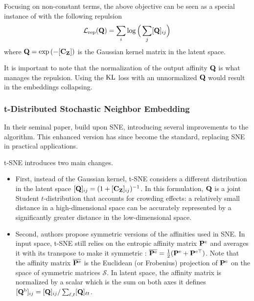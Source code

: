 Focusing on non-constant terms, the above objective can be seen as a special instance of  with the following repulsion
\begin{align}
    \mathcal{L}_{\mathrm{rep}}({\mathbf{Q}}) = \sum_{i} \log \Big(\sum_j [{\mathbf{Q}}]_{ij} \Big)
\end{align}
where ${\mathbf{Q}} = \exp{(-[{\mathbf{C}}_{{\mathbf{Z}}}])}$ is the Gaussian kernel matrix in the latent space.

\begin{remark}\label{rem:norm_as_repulsion}
    It is important to note that the normalization of the output affinity ${\mathbf{Q}}$ is what manages the repulsion. Using the $\operatorname{KL}$ loss with an unnormalized ${\mathbf{Q}}$ would result in the embeddings collapsing. 
\end{remark}

\subsubsection{t-Distributed Stochastic Neighbor Embedding}

In their seminal paper, \citet{van2008visualizing} build upon SNE, introducing several improvements to the algorithm. This enhanced version has since become the standard, replacing SNE in practical applications.

t-SNE introduces two main changes. 
\begin{itemize}
    \item First, instead of the Gaussian kernel, t-SNE considers a different distribution in the latent space $[{\mathbf{Q}}]_{ij} = (1 + [\mathbf{C}_{\mathbf{Z}}]_{ij})^{-1}$. In this formulation, ${\mathbf{Q}}$ is a joint Student $t$-distribution that accounts for crowding effects: a relatively small
    distance in a high-dimensional space can be accurately represented by a
    significantly greater distance in the low-dimensional space. 
    \item Second, authors propose symmetric versions of the affinities used in SNE. In input space, t-SNE still relies on the entropic affinity matrix ${\mathbf{P}}^{\mathrm{e}}$ and averages it with its transpose to make it symmetric : $\overline{{\mathbf{P}}^{\mathrm{e}}} = \frac{1}{2}({\mathbf{P}}^{\mathrm{e}} + {\mathbf{P}}^{\mathrm{e} \top})$. Note that the affinity matrix $\overline{{\mathbf{P}}^{\mathrm{e}}}$ is the Euclidean (or Frobenius) projection of ${\mathbf{P}}^{\mathrm{e}}$ on the space of symmetric matrices $\mathcal{S}$. In latent space, the affinity matrix is normalized by a scalar which is the sum on both axes \ie it defines $[{\mathbf{Q}}^{\mathrm{b}}]_{ij} = [{\mathbf{Q}}]_{ij} /\sum_{\ell,t}[{\mathbf{Q}}]_{\ell t}$.
\end{itemize}

